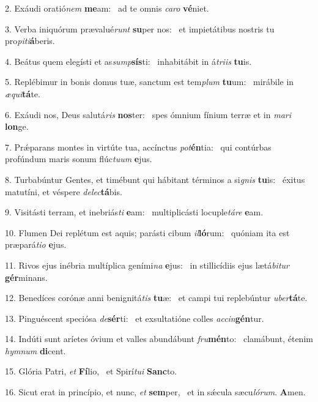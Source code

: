 2. Exáudi oratió\textit{nem} \textbf{me}am: \ast\  ad te omnis \textit{ca}\textit{ro} \textbf{vé}niet.\

3. Verba iniquórum prævalué\textit{runt} \textbf{su}per nos: \ast\  et impietátibus nostris tu pro\textit{pi}\textit{ti}\textbf{á}beris.\

4. Beátus quem elegísti et as\textit{sump}\textbf{sís}ti: \ast\  inhabitábit in á\textit{tri}\textit{is} \textbf{tu}is.\

5. Replébimur in bonis domus tuæ, sanctum est tem\textit{plum} \textbf{tu}um: \ast\  mirábile in \textit{æ}\textit{qui}\textbf{tá}te.\

6. Exáudi nos, Deus salutá\textit{ris} \textbf{nos}ter: \ast\  spes ómnium fínium terræ et in \textit{ma}\textit{ri} \textbf{lon}ge.\

7. Prǽparans montes in virtúte tua, accínctus \textit{pot}\textbf{én}tia: \ast\  qui contúrbas profúndum maris sonum flúc\textit{tu}\textit{um} \textbf{e}jus.\

8. Turbabúntur Gentes, et timébunt qui hábitant términos a si\textit{gnis} \textbf{tu}is: \ast\  éxitus matutíni, et véspere \textit{de}\textit{lec}\textbf{tá}bis.\

9. Visitásti terram, et inebriás\textit{ti} \textbf{e}am: \ast\  multiplicásti locuple\textit{tá}\textit{re} \textbf{e}am.\

10. Flumen Dei replétum est aquis; parásti cibum \textit{il}\textbf{ló}rum: \ast\  quóniam ita est præpará\textit{ti}\textit{o} \textbf{e}jus.\

11. Rivos ejus inébria multíplica geními\textit{na} \textbf{e}jus: \ast\  in stillicídiis ejus lætá\textit{bi}\textit{tur} \textbf{gér}minans.\

12. Benedíces corónæ anni benignitá\textit{tis} \textbf{tu}æ: \ast\  et campi tui replebúntur \textit{u}\textit{ber}\textbf{tá}te.\

13. Pinguéscent speciósa \textit{de}\textbf{sér}ti: \ast\  et exsultatióne colles \textit{ac}\textit{cin}\textbf{gén}tur.\

14. Indúti sunt aríetes óvium et valles abundábunt \textit{fru}\textbf{mén}to: \ast\  clamábunt, étenim \textit{hym}\textit{num} \textbf{di}cent.\

15. Glória Patri, \textit{et} \textbf{Fí}lio, \ast\  et Spirí\textit{tu}\textit{i} \textbf{Sanc}to.\

16. Sicut erat in princípio, et nunc, \textit{et} \textbf{sem}per, \ast\  et in sǽcula sæcu\textit{ló}\textit{rum}. \textbf{A}men.\


